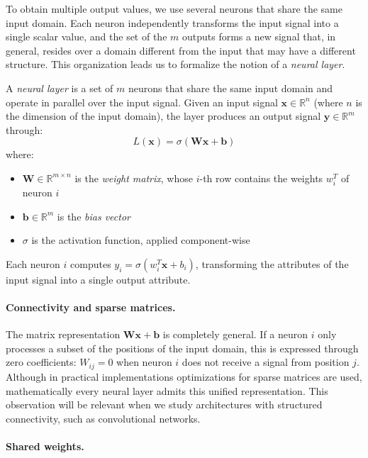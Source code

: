 To obtain multiple output values, we use several neurons that share the same input domain. Each neuron independently transforms the input signal into a single scalar value, and the set of the $m$ outputs forms a new signal that, in general, resides over a domain different from the input that may have a different structure. This organization leads us to formalize the notion of a \textit{neural layer}.

\begin{definition}
\label{def:capa_neuronal}
A \textit{neural layer} is a set of $m$ neurons that share the same input domain and operate in parallel over the input signal. Given an input signal $\mathbf{x} \in \mathbb{R}^n$ (where $n$ is the dimension of the input domain), the layer produces an output signal $\mathbf{y} \in \mathbb{R}^m$ through:
\[
L(\mathbf{x}) = \sigma(\mathbf{W}\mathbf{x} + \mathbf{b})
\]
where:
\begin{itemize}
    \item $\mathbf{W} \in \mathbb{R}^{m \times n}$ is the \textit{weight matrix}, whose $i$-th row contains the weights $w_i^T$ of neuron $i$
    \item $\mathbf{b} \in \mathbb{R}^m$ is the \textit{bias vector}
    \item $\sigma$ is the activation function, applied component-wise
\end{itemize}
Each neuron $i$ computes $y_i = \sigma(w_i^T \mathbf{x} + b_i)$, transforming the attributes of the input signal into a single output attribute.
\end{definition}

\paragraph{Connectivity and sparse matrices.}

 The matrix representation $\mathbf{W}\mathbf{x} + \mathbf{b}$ is completely general. If a neuron $i$ only processes a subset of the positions of the input domain, this is expressed through zero coefficients: $W_{ij} = 0$ when neuron $i$ does not receive a signal from position $j$. Although in practical implementations optimizations for sparse matrices are used, mathematically every neural layer admits this unified representation. This observation will be relevant when we study architectures with structured connectivity, such as convolutional networks.

\paragraph{Shared weights.}


